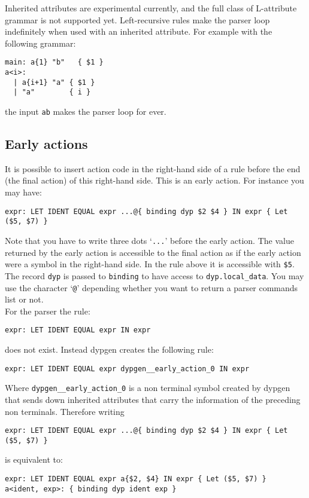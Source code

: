 \documentclass[12pt]{article}
\begin{document}
{Inherited attributes are experimental currently, and the full class of L-attribute grammar is not supported yet. Left-recursive rules make the parser loop indefinitely when used with an inherited attribute. For example with the following grammar:
\begin{verbatim}
main: a{1} "b"   { $1 }
a<i>:
  | a{i+1} "a" { $1 }
  | "a"        { i }
\end{verbatim}
the input \verb|ab| makes the parser loop for ever.

\subsection{Early actions}

It is possible to insert action code in the right-hand side of a rule before the end (the final action) of this right-hand side. This is an early action. For instance you may have:
\begin{verbatim}
expr: LET IDENT EQUAL expr ...@{ binding dyp $2 $4 } IN expr { Let ($5, $7) }
\end{verbatim}
Note that you have to write three dots `\verb|...|' before the early action. The value returned by the early action is accessible to the final action as if the early action were a symbol in the right-hand side. In the rule above it is accessible with \verb|$5|. The record \verb|dyp| is passed to \verb|binding| to have access to \verb|dyp.local_data|. You may use the character `\verb|@|' depending whether you want to return a parser commands list or not.\\

For the parser the rule:
\begin{verbatim}
expr: LET IDENT EQUAL expr IN expr
\end{verbatim}
does not exist. Instead dypgen creates the following rule:
\begin{verbatim}
expr: LET IDENT EQUAL expr dypgen__early_action_0 IN expr
\end{verbatim}
Where \verb|dypgen__early_action_0| is a non terminal symbol created by dypgen that sends down inherited attributes that carry the information of the preceding non terminals. Therefore writing
\begin{verbatim}
expr: LET IDENT EQUAL expr ...@{ binding dyp $2 $4 } IN expr { Let ($5, $7) }
\end{verbatim}
is equivalent to:
\begin{verbatim}
expr: LET IDENT EQUAL expr a{$2, $4} IN expr { Let ($5, $7) }
a<ident, exp>: { binding dyp ident exp }
\end{verbatim}

}
\end{document}
